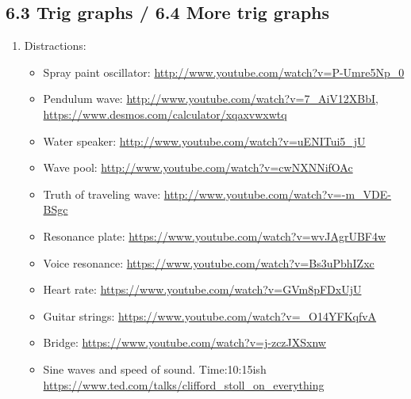 \documentclass{article}
\begin{document}
\subsection{6.3 Trig graphs / 6.4 More trig graphs}

\begin{enumerate}



\item Distractions: 
\begin{itemize}
\item Spray paint oscillator: \url{http://www.youtube.com/watch?v=P-Umre5Np_0}
\item Pendulum wave: \url{http://www.youtube.com/watch?v=7_AiV12XBbI}, \url{https://www.desmos.com/calculator/xqaxvwxwtq}
\item Water speaker: \url{http://www.youtube.com/watch?v=uENITui5_jU}
\item Wave pool: \url{http://www.youtube.com/watch?v=cwNXNNifOAc}
\item Truth of traveling wave: \url{http://www.youtube.com/watch?v=-m_VDE-BSgc}
\item Resonance plate: \url{https://www.youtube.com/watch?v=wvJAgrUBF4w}
\item Voice resonance: \url{https://www.youtube.com/watch?v=Bs3uPbhIZxc}
\item Heart rate: \url{https://www.youtube.com/watch?v=GVm8pFDxUjU}
\item Guitar strings: \url{https://www.youtube.com/watch?v=_O14YFKqfvA}
\item Bridge: \url{https://www.youtube.com/watch?v=j-zczJXSxnw}
\item Sine waves and speed of sound. Time:10:15ish \url{https://www.ted.com/talks/clifford_stoll_on_everything}
\end{itemize}


\end{enumerate}
\end{document}
